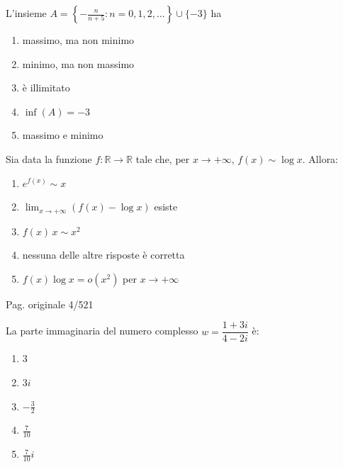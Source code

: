 \begin{quiz}
L'insieme $A=\left\{-\frac{n}{n+5}:n=0,1,2,\ldots\right\}\cup\{-3\}$ ha
\begin{enumerate}[label=\alph*),leftmargin=1.3cm,itemsep=3pt,topsep=5pt]\item massimo, ma non minimo\item minimo, ma non massimo\item \`e illimitato\item $\inf(A)=-3$\item massimo e minimo\end{enumerate}
\end{quiz}

\begin{quiz}
Sia data la funzione $f:\mathbb R\to\mathbb R$ tale che, per $x\to+\infty$, $f(x)\sim\log x$. Allora:
\begin{enumerate}[label=\alph*),leftmargin=1.3cm,itemsep=3pt,topsep=5pt]\item $e^{f(x)}\sim x$\item $\lim_{x\to+\infty}(f(x)-\log x)$ esiste\item $f(x)\,x\sim x^2$\item nessuna delle altre risposte \`e corretta\item $f(x)\log x=o(x^2)$ per $x\to+\infty$\end{enumerate}
\end{quiz}

\par\noindent\hfill{\color{cyan!65!black}\scriptsize Pag. originale 4/521}\par\smallskip
\begin{quiz}
La parte immaginaria del numero complesso $w=\dfrac{1+3i}{4-2i}$ \`e:
\begin{enumerate}[label=\alph*),leftmargin=1.3cm,itemsep=3pt,topsep=5pt]\item $3$\item $3i$\item $-\frac32$\item $\frac7{10}$\item $\frac7{10}i$\end{enumerate}
\end{quiz}

